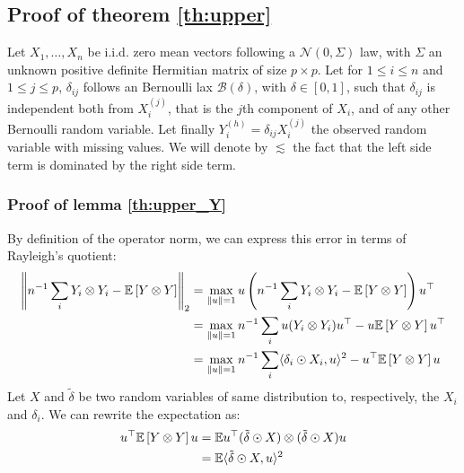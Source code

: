 \documentclass{article}
\numberwithin{equation}{section}
\numberwithin{equation}{section}
\begin{document}
\subsection{Proof of theorem \ref{th:upper}}
\label{proof:upper}

    Let $X_1, \dots, X_n$ be i.i.d. zero mean vectors following a $\mathcal{N}(0, \Sigma)$ law, with $\Sigma$ an unknown positive definite Hermitian matrix of size $p\times p$. Let for $1\leq i\leq n$ and $1\leq j\leq p$, $\delta_{ij}$ follows an Bernoulli lax $\mathcal{B}(\delta)$, with $\delta\in [0,1]$, such that $\delta_{ij}$ is independent both from $X_i^{(j)}$, that is the $j$th component of $X_i$, and of any other Bernoulli random variable. Let finally $Y_i^{(h)} = \delta_{ij} X_i^{(j)}$ the observed random variable with missing values. We will denote by $\lesssim$ the fact that the left side term is dominated by the right side term.
    
    \subsubsection{Proof of lemma \ref{th:upper_Y}}
    \label{proof:upper_Y}

    By definition of the operator norm, we can express this error in terms of Rayleigh's quotient:
    \begin{equation} \label{eqn:rayleigh}
    \begin{split}
        \left\Vert n^{-1}\sum_i Y_i\otimes Y_i - \mathbb{E}\left[ Y\otimes Y\right] \right\Vert_2 &= \max_{\left\Vert u \right\Vert = 1} u \left( n^{-1}\sum_i Y_i\otimes Y_i - \mathbb{E}\left[ Y\otimes Y\right] \right)u^\top\\
        &= \max_{\left\Vert u \right\Vert=1} n^{-1}\sum_i u (Y_i\otimes Y_i)u^\top - u  \mathbb{E}\left[ Y\otimes Y\right] u^\top\\
        &= \max_{\left\Vert u \right\Vert=1} n^{-1}\sum_i \langle \delta_i \odot X_i , u \rangle^2 - u^\top \mathbb{E} \left[Y\otimes Y\right] u
    \end{split}
    \end{equation}
    Let $X$ and $\tilde{\delta}$ be two random variables of same distribution to, respectively, the $X_i$ and $\delta_i$. We can rewrite the expectation as:
    \begin{equation}
    \begin{split}
        u^\top \mathbb{E} \left[ Y\otimes Y\right] u &= \mathbb{E} u^\top (\tilde{\delta} \odot X) \otimes (\tilde{\delta} \odot X) u\\
        &= \mathbb{E} \langle \tilde{\delta} \odot X , u \rangle^2
    \end{split}
    \end{equation}
        
\end{document}
